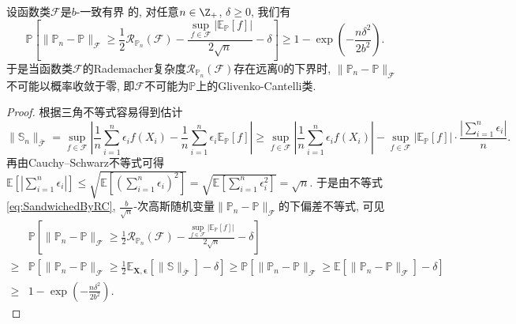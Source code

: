 \begin{proposition}\label{thm:EmpericalMeasureErrorLowerBddByRC}
	设函数类$\mathscr{F}$是$b$-一致有界	的, 对任意$n \in \Z_+$, $\delta \geq 0$, 我们有
	\begin{equation*}
		\mathbb{P} \left[ \|\mathbb{P}_n - \mathbb{P}\|_{\mathscr{F}} \geq \frac{1}{2} \mathcal{R}_{\mathbb{P}_n}(\mathscr{F}) - \frac{\sup_{f \in \mathscr{F}}\left|\mathbb{E}_{\mathbb{P}}[f]\right|}{2 \sqrt{n}} - \delta \right]
		\geq 1 - \exp \left(- \frac{n \delta^2}{2 b^2} \right). 
	\end{equation*}
	于是当函数类$\mathscr{F}$的Rademacher复杂度$\mathcal{R}_{\mathbb{P}_n}(\mathscr{F})$存在远离$0$的下界时, $\|\mathbb{P}_n - \mathbb{P}\|_{\mathscr{F}}$不可能以概率收敛于零, 即$\mathscr{F}$不可能为$\mathbb{P}$上的Glivenko-Cantelli类.
\end{proposition}
\begin{proof}
	根据三角不等式容易得到估计
	\begin{equation*}
		\|\mathbb{S}_n\|_{\bar{\mathscr{F}}}
		= \sup_{f \in \mathscr{F}} \left|\frac{1}{n} \sum_{i=1}^n \epsilon_i f(X_i) - \frac{1}{n} \sum_{i=1}^n \epsilon_i \mathbb{E}_{\mathbb{P}}[f] \right|
		\geq \sup_{f \in \mathscr{F}} \left|\frac{1}{n} \sum_{i=1}^n \epsilon_i f(X_i)\right| - \sup_{f \in \mathscr{F}} \left|\mathbb{E}_{\mathbb{P}}[f]\right| \cdot \frac{\left| \sum_{i=1}^n \epsilon_i \right|}{n}.
	\end{equation*}
	再由Cauchy–Schwarz不等式可得$\displaystyle \mathbb{E}\left[\left| \sum_{i=1}^n \epsilon_i \right|\right] \leq \sqrt{\mathbb{E}\left[ \left(\sum_{i=1}^n \epsilon_i\right)^2 \right]} = \sqrt{\mathbb{E}\left[ \sum_{i=1}^n \epsilon_i^2 \right]} = \sqrt{n}$. 
	于是由不等式\eqref{eq:SandwichedByRC}, $\frac{b}{\sqrt{n}}$-次高斯随机变量$\|\mathbb{P}_n - \mathbb{P}\|_{\mathscr{F}}$的下偏差不等式, 可见
	\begin{align*}
		& \mathbb{P} \left[ \|\mathbb{P}_n - \mathbb{P}\|_{\mathscr{F}} \geq \frac{1}{2} \mathcal{R}_{\mathbb{P}_n}(\mathscr{F}) - \frac{\sup_{f \in \mathscr{F}}\left|\mathbb{E}_{\mathbb{P}}[f]\right|}{2 \sqrt{n}} - \delta \right] \\
		\geq & \mathbb{P} \left[ \|\mathbb{P}_n - \mathbb{P}\|_{\mathscr{F}} \geq \frac{1}{2} \mathbb{E}_{\bm{X}, \bm{\epsilon}} \left[\|\mathbb{S}\|_{\bar{\mathscr{F}}}\right] - \delta \right]
		\geq \mathbb{P} \left[ \|\mathbb{P}_n - \mathbb{P}\|_{\mathscr{F}} \geq \mathbb{E} \left[ \|\mathbb{P}_n - \mathbb{P}\|_{\mathscr{F}} \right] - \delta \right] \\
		\geq & 1 - \exp \left(- \frac{n \delta^2}{2 b^2} \right). 
	\end{align*}
\end{proof}

